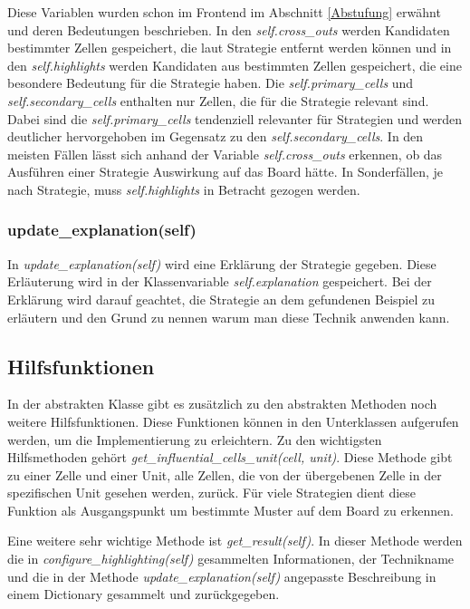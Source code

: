 Diese Variablen wurden schon im Frontend im Abschnitt \ref{Abstufung} erwähnt und deren Bedeutungen beschrieben. In den \textit{self.cross\_outs} werden Kandidaten bestimmter Zellen gespeichert, die laut Strategie entfernt werden können und in den \textit{self.highlights} werden Kandidaten aus bestimmten Zellen gespeichert, die eine besondere Bedeutung für die Strategie haben. Die \textit{self.primary\_cells} und \textit{self.secondary\_cells} enthalten nur Zellen, die für die Strategie relevant sind. Dabei sind die \textit{self.primary\_cells} tendenziell relevanter für Strategien und werden deutlicher hervorgehoben im Gegensatz zu den \textit{self.secondary\_cells}. In den meisten Fällen lässt sich anhand der Variable \textit{self.cross\_outs} erkennen, ob das Ausführen einer Strategie Auswirkung auf das Board hätte. In Sonderfällen, je nach Strategie, muss \textit{self.highlights} in Betracht gezogen werden.

\subsubsection{update\_explanation(self)}
In \textit{update\_explanation(self)} wird eine Erklärung der Strategie gegeben. Diese Erläuterung wird in der Klassenvariable \textit{self.explanation} gespeichert. Bei der Erklärung wird darauf geachtet, die Strategie an dem gefundenen Beispiel zu erläutern und den Grund zu nennen warum man diese Technik anwenden kann.

\subsection{Hilfsfunktionen}

In der abstrakten Klasse gibt es zusätzlich zu den abstrakten Methoden noch weitere Hilfsfunktionen. Diese Funktionen können in den Unterklassen aufgerufen werden, um die Implementierung zu erleichtern. Zu den wichtigsten Hilfsmethoden gehört \textit{get\_influential\_cells\_unit(cell, unit)}. Diese Methode gibt zu einer Zelle und einer Unit, alle Zellen, die von der übergebenen Zelle in der spezifischen Unit gesehen werden, zurück. Für viele Strategien dient diese Funktion als Ausgangspunkt um bestimmte Muster auf dem Board zu erkennen.

Eine weitere sehr wichtige Methode ist \textit{get\_result(self)}. In dieser Methode werden die in \textit{configure\_highlighting(self)} gesammelten Informationen, der Technikname und die in der Methode \textit{update\_explanation(self)} angepasste Beschreibung in einem Dictionary gesammelt und zurückgegeben. 


